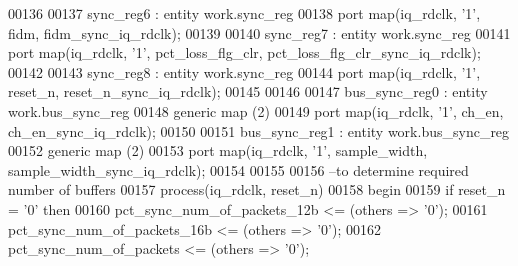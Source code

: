 \begin{DoxyCode}
00136  
00137 sync\_reg6 : \textcolor{keywordflow}{entity} work.sync_reg 
00138  \textcolor{keywordflow}{port} \textcolor{keywordflow}{map}(iq_rdclk, '1', fidm, fidm_sync_iq_rdclk\textcolor{vhdlchar}{)};
00139 
00140 sync\_reg7 : \textcolor{keywordflow}{entity} work.sync_reg 
00141  \textcolor{keywordflow}{port} \textcolor{keywordflow}{map}(iq_rdclk, '1', pct_loss_flg_clr, pct_loss_flg_clr_sync_iq_rdclk\textcolor{vhdlchar}{)};
00142 
00143 sync\_reg8 : \textcolor{keywordflow}{entity} work.sync_reg 
00144  \textcolor{keywordflow}{port} \textcolor{keywordflow}{map}(iq_rdclk, '1', reset_n, reset_n_sync_iq_rdclk\textcolor{vhdlchar}{)}; 
00145  
00146  
00147 bus\_sync\_reg0 : \textcolor{keywordflow}{entity} work.bus_sync_reg
00148  \textcolor{keywordflow}{generic} \textcolor{keywordflow}{map} (\textcolor{vhdllogic}{2}\textcolor{vhdlchar}{)} 
00149  \textcolor{keywordflow}{port} \textcolor{keywordflow}{map}(iq_rdclk, '1', ch_en, ch_en_sync_iq_rdclk\textcolor{vhdlchar}{)};
00150 
00151 bus\_sync\_reg1 : \textcolor{keywordflow}{entity} work.bus_sync_reg
00152  \textcolor{keywordflow}{generic} \textcolor{keywordflow}{map} (\textcolor{vhdllogic}{2}\textcolor{vhdlchar}{)} 
00153  \textcolor{keywordflow}{port} \textcolor{keywordflow}{map}(iq_rdclk, '1', sample_width, sample_width_sync_iq_rdclk\textcolor{vhdlchar}{)}; 
00154  
00155 
00156 \textcolor{keyword}{--to determine required number of buffers}
00157 \textcolor{keywordflow}{process}(iq_rdclk, reset_n)
00158 \textcolor{vhdlkeyword}{begin}
00159    \textcolor{keywordflow}{if} \textcolor{vhdlchar}{reset_n} \textcolor{vhdlchar}{=} \textcolor{vhdlchar}{'}\textcolor{vhdllogic}{}\textcolor{vhdllogic}{0}\textcolor{vhdlchar}{'} \textcolor{keywordflow}{then}
00160       \textcolor{vhdlchar}{pct_sync_num_of_packets_12b}   \textcolor{vhdlchar}{<=} \textcolor{vhdlchar}{(}\textcolor{keywordflow}{others} \textcolor{vhdlchar}{=}\textcolor{vhdlchar}{>} \textcolor{vhdlchar}{'}\textcolor{vhdllogic}{}\textcolor{vhdllogic}{0}\textcolor{vhdlchar}{'}\textcolor{vhdlchar}{)};
00161       \textcolor{vhdlchar}{pct_sync_num_of_packets_16b}   \textcolor{vhdlchar}{<=} \textcolor{vhdlchar}{(}\textcolor{keywordflow}{others} \textcolor{vhdlchar}{=}\textcolor{vhdlchar}{>} \textcolor{vhdlchar}{'}\textcolor{vhdllogic}{}\textcolor{vhdllogic}{0}\textcolor{vhdlchar}{'}\textcolor{vhdlchar}{)};
00162       \textcolor{vhdlchar}{pct_sync_num_of_packets}       \textcolor{vhdlchar}{<=} \textcolor{vhdlchar}{(}\textcolor{keywordflow}{others} \textcolor{vhdlchar}{=}\textcolor{vhdlchar}{>} \textcolor{vhdlchar}{'}\textcolor{vhdllogic}{}\textcolor{vhdllogic}{0}\textcolor{vhdlchar}{'}\textcolor{vhdlchar}{)};

\end{DoxyCode}
